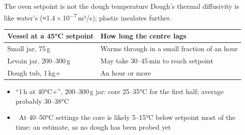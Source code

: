 \documentclass[aspectratio=169,11pt]{beamer}
\newcommand{\tablestart}[2]{\begingroup\renewcommand{\arraystretch}{#1}#2}
\newcommand{\tableend}{\endgroup\par}
\begin{document}
\begin{frame}{The oven setpoint is not the dough temperature}
  Dough's thermal diffusivity is like water's (≈1.4\,×\,10\textsuperscript{−7}\,m²/s);
  plastic insulates further.\par\smallskip
  \tablestart{1.0}{\footnotesize}
  \begin{tabularx}{\linewidth}{@{}P{3.6cm}L@{}}
    \toprule
    \textbf{Vessel at a 45°C setpoint} & \textbf{How long the centre lags} \\
    \midrule
    Small jar, 75\,g & Warms through in a small fraction of an hour \\
    Levain jar, 200–300\,g & May take 30–45\,min to reach setpoint \\
    Dough tub, 1\,kg+ & An hour or more \\
    \bottomrule
  \end{tabularx}
  \tableend
  \begin{itemize}
    \item ``1\,h at 40°C+'', 200–300\,g jar: core 25–35°C for the first half; average
      probably 30–38°C
    \item \untested\ At 40–50°C settings the core is likely 5–15°C below setpoint most of
      the time: an estimate, as no dough has been probed yet
  \end{itemize}
\end{frame}
\end{document}
